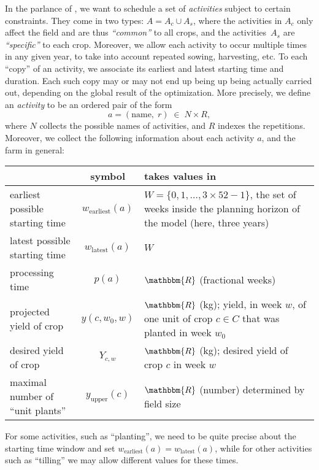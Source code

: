 \documentclass[11pt,reqno]{amsart}
\newcommand{\RR}{\mathbbm{R}}
\numberwithin{equation}{section}
\begin{document}
In the parlance of \cite{artigues-etal11}, we want to schedule a set
of \emph{activities} subject to certain constraints. 
%
%
They come in two types: $A=A_c\cup A_s$, where the activities in $A_c$ only affect the
field and are thus \emph{``common''} to all crops, and the activities~$A_s$ are
\emph{``specific''} to each crop. Moreover, we allow each activity to occur multiple times
in any given year, to take into account repeated sowing, harvesting, etc. To each ``copy''
of an activity, we associate its earliest and latest starting time and duration. Each such
copy may or may not end up being up being actually carried out, depending on the global
result of the optimization.  More precisely, we define an \emph{activity} to be an ordered
pair of the form
\[
  a = (\text{name}, \; r) \;\in\;
  N\times R,
\]
where $N$ collects the possible names of activities, and $R$ indexes the
repetitions. Moreover, we collect the following information about each activity $a$, and
the farm in general:
\begin{center}
  \begin{tabular}{lcp{8cm}}
    & symbol & takes values in\\\hline 
    earliest possible starting time & $w_{\text{earliest}}(a)$ & $W=\{0,1,\dots,3\times 52-1\}$, the
    set of  weeks inside the planning horizon of the model (here, three years)\\ 
    latest possible starting time & $w_{\text{latest}}(a)$ & $W$ \\ 
    processing time & $p(a)$ & $\RR$ (fractional weeks)\\ 
    projected yield of crop & $y(c,w_0,w)$ & $\RR$ (kg); yield, in week $w$, of one unit of crop $c\in C$ that was planted in week $w_0$\\
    desired yield of crop & $Y_{c,w}$ & $\RR$ (kg); desired yield of crop $c$ in week $w$\\
    maximal number of ``unit plants''  & $y_{\text{upper}}(c)$ & $\RR$ (number) determined by field size\\ \hline
  \end{tabular}
\end{center}

For some activities, such as ``planting'', we need to be quite precise about the starting time
window and set $w_{\text{earliest}}(a) = w_{\text{latest}}(a)$, while for other activities
such as ``tilling'' we may allow different values for these times.
\end{document}
